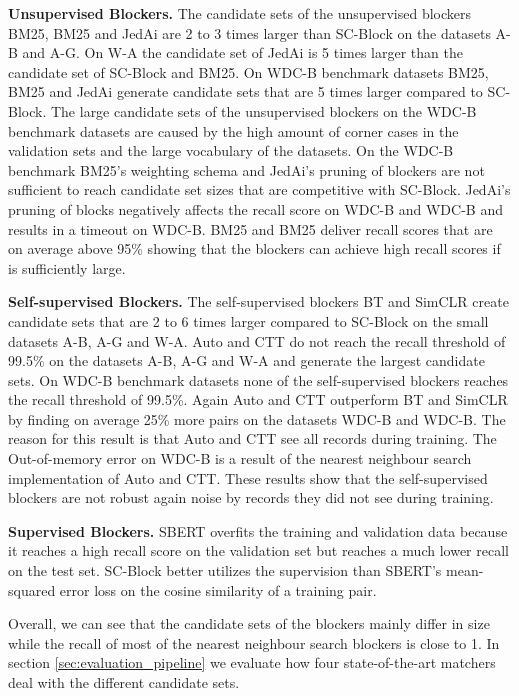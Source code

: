 \documentclass[sigconf,nonacm]{acmart}
\begin{document}
\vspace{.1cm}\noindent\textbf{Unsupervised Blockers.}
The candidate sets of the unsupervised blockers BM25, BM25 and JedAi are 2 to 3 times larger than SC-Block on the datasets A-B and A-G.
On W-A the candidate set of JedAi is 5 times larger than the candidate set of SC-Block and BM25.
On WDC-B benchmark datasets BM25, BM25 and JedAi generate candidate sets that are 5 times larger compared to SC-Block.
The large candidate sets of the unsupervised blockers on the WDC-B benchmark datasets are caused by the high amount of corner cases in the validation sets and the large vocabulary of the datasets.
On the WDC-B benchmark BM25's weighting schema and JedAi's pruning of blockers are not sufficient to reach candidate set sizes that are competitive with SC-Block.
JedAi's pruning of blocks negatively affects the recall score on WDC-B and WDC-B and results in a timeout on WDC-B.
BM25 and BM25 deliver recall scores that are on average above 95\% showing that the blockers can achieve high recall scores if  is sufficiently large.



\vspace{.1cm}\noindent\textbf{Self-supervised Blockers.}
The self-supervised blockers BT and SimCLR create candidate sets that are 2 to 6 times larger compared to SC-Block on the small datasets A-B, A-G and W-A.
Auto and CTT do not reach the recall threshold of 99.5\% on the datasets A-B, A-G and W-A and generate the largest candidate sets.
On WDC-B benchmark datasets none of the self-supervised blockers reaches the recall threshold of 99.5\%.
Again Auto and CTT outperform BT and SimCLR by finding on average 25\% more pairs on the datasets WDC-B and WDC-B. The reason for this result is that Auto and CTT see all records during training. The Out-of-memory error on WDC-B is a result of the nearest neighbour search implementation of Auto and CTT.
These results show that the self-supervised blockers are not robust again noise by records they did not see during training.

\vspace{.1cm}\noindent\textbf{Supervised Blockers.}
SBERT overfits the training and validation data because it reaches a high recall score on the validation set but reaches a much lower recall on the test set.
SC-Block better utilizes the supervision than SBERT's mean-squared error loss on the cosine similarity of a training pair.


Overall, we can see that the candidate sets of the blockers mainly differ in size while the recall of most of the nearest neighbour search blockers is close to 1.
In section \ref{sec:evaluation_pipeline} we evaluate how four state-of-the-art matchers deal with the different candidate sets.
\end{document}

